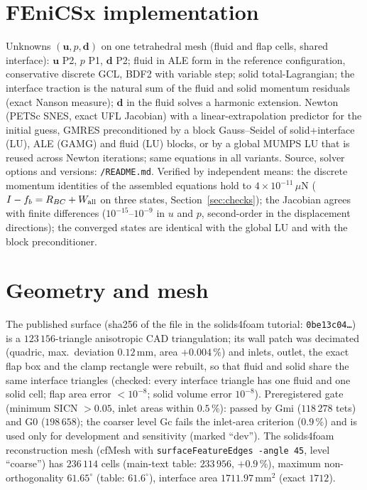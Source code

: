 \documentclass[sn-mathphys,Numbered]{sn-jnl}
\newcommand{\data}{\detokenize{paper-data/fenicsx_hessenthaler}}
\begin{document}
\section{FEniCSx implementation}\label{sec:fenicsx}
Unknowns $(\bm u,p,\bm d)$ on one tetrahedral mesh (fluid and flap cells, shared interface): $\bm u$ P2, $p$ P1, $\bm d$ P2; fluid in ALE form in the reference configuration, conservative discrete GCL, BDF2 with variable step; solid total-Lagrangian; the interface traction is the natural sum of the fluid and solid momentum residuals (exact Nanson measure); $\bm d$ in the fluid solves a harmonic extension. Newton (PETSc SNES, exact UFL Jacobian) with a linear-extrapolation predictor for the initial guess, GMRES preconditioned by a block Gauss--Seidel of solid+interface (LU), ALE (GAMG) and fluid (LU) blocks, or by a global MUMPS LU that is reused across Newton iterations; same equations in all variants. Source, solver options and versions: \texttt{\data/README.md}. Verified by independent means: the discrete momentum identities of the assembled equations hold to $4\times10^{-11}\,\mu\mathrm N$ ($I-f_b=R_{BC}+W_{\rm all}$ on three states, Section~\ref{sec:checks}); the Jacobian agrees with finite differences ($10^{-15}$--$10^{-9}$ in $u$ and $p$, second-order in the displacement directions); the converged states are identical with the global LU and with the block preconditioner.

\section{Geometry and mesh}
The published surface (sha256 of the file in the solids4foam tutorial: \texttt{0be13c04\ldots}) is a $123\,156$-triangle anisotropic CAD triangulation; its wall patch was decimated (quadric, max.\ deviation $0.12\,\mathrm{mm}$, area $+0.004\,\%$) and inlets, outlet, the exact flap box and the clamp rectangle were rebuilt, so that fluid and solid share the same interface triangles (checked: every interface triangle has one fluid and one solid cell; flap area error $<10^{-8}$; solid volume error $10^{-8}$). Preregistered gate (minimum SICN $>0.05$, inlet areas within $0.5\,\%$): passed by Gmi ($118\,278$ tets) and G0 ($198\,658$); the coarser level Gc fails the inlet-area criterion ($0.9\,\%$) and is used only for development and sensitivity (marked ``dev''). The solids4foam reconstruction mesh (cfMesh with \texttt{surfaceFeatureEdges -angle 45}, level ``coarse'') has $236\,114$ cells (main-text table: $233\,956$, $+0.9\,\%$), maximum non-orthogonality $61.65^\circ$ (table: $61.6^\circ$), interface area $1711.97\,\mathrm{mm^2}$ (exact $1712$).
\end{document}
